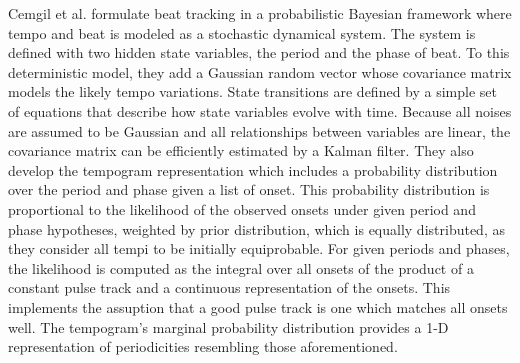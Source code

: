\documentclass{scrartcl}
\begin{document}

Cemgil et al. \cite{Cemgil2001} formulate beat tracking in a probabilistic Bayesian framework where tempo and beat is modeled as a stochastic dynamical system. The system is defined with two hidden state variables, the period and the phase of beat. To this deterministic model, they add a Gaussian random vector whose covariance matrix models the likely tempo variations. State transitions are defined by a simple set of equations that describe how state variables evolve with time. 
Because all noises are assumed to be Gaussian and all relationships between variables are linear, the covariance matrix can be efficiently estimated by a Kalman filter. They also develop the tempogram representation which includes a probability distribution over the period and phase given a list of onset. This probability distribution is proportional to the likelihood of the observed onsets under given period and phase hypotheses, weighted by prior distribution, which is equally distributed, as they consider all tempi to be initially equiprobable. For given periods and phases, the likelihood is computed as the integral over all onsets of the product of a constant pulse track and a continuous representation of the onsets. This implements the assuption that a good pulse track is one which matches all onsets well. The tempogram's marginal probability distribution provides a 1-D representation of periodicities resembling those aforementioned. 
\end{document}
